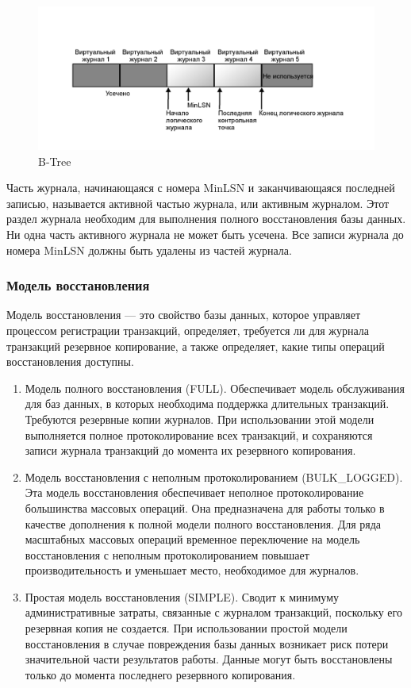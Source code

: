 \begin{figure}[ht!]
	\centering
	\includegraphics[width=18cm, keepaspectratio]{assets/physics.png}
	\caption{B-Tree} 
\end{figure}
\FloatBarrier

Часть журнала, начинающаяся с номера MinLSN и заканчивающаяся
последней записью,
называется активной частью журнала, или активным журналом. Этот
раздел журнала
необходим для выполнения полного восстановления базы данных. Ни одна
часть
активного журнала не может быть усечена. Все записи журнала до номера
MinLSN
должны быть удалены из частей журнала.

\subsubsection{Модель восстановления}

Модель восстановления --- это свойство базы данных, которое управляет процессом регистрации транзакций, определяет, требуется ли для журнала транзакций резервное копирование, а также определяет, какие типы операций восстановления доступны.

\begin{enumerate}
	\item Модель полного восстановления (FULL). Обеспечивает модель обслуживания для баз данных, в которых 
	необходима поддержка длительных транзакций. Требуются резервные копии журналов. При использовании этой 
	модели выполняется полное протоколирование всех транзакций, и сохраняются записи журнала транзакций до 
	момента их резервного копирования.
	\item Модель восстановления с неполным протоколированием (BULK\_LOGGED). Эта модель восстановления 
	обеспечивает неполное протоколирование большинства массовых операций. Она предназначена для работы только в 
	качестве дополнения к полной модели полного восстановления. Для ряда масштабных массовых операций временное переключение на модель восстановления с неполным протоколированием повышает производительность и уменьшает место, необходимое для журналов.
	\item Простая модель восстановления (SIMPLE). Сводит к минимуму административные затраты, связанные с 
	журналом транзакций, поскольку его резервная копия не создается. При использовании простой модели 
	восстановления в случае повреждения базы данных возникает риск потери значительной части результатов работы. 
	Данные могут быть восстановлены только до момента последнего резервного копирования.
\end{enumerate}

